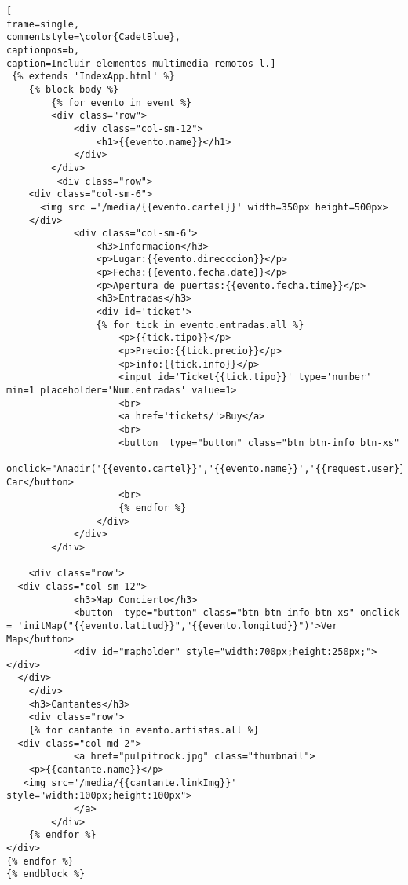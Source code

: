 \begin{lstlisting}[
frame=single,
commentstyle=\color{CadetBlue},
captionpos=b,
caption=Incluir elementos multimedia remotos l.]
 {% extends 'IndexApp.html' %}
	{% block body %}
		{% for evento in event %}
		<div class="row">
			<div class="col-sm-12">
				<h1>{{evento.name}}</h1>
			</div>
		</div>
		 <div class="row">
    <div class="col-sm-6">
      <img src ='/media/{{evento.cartel}}' width=350px height=500px>
    </div>
			<div class="col-sm-6">
				<h3>Informacion</h3>
				<p>Lugar:{{evento.direcccion}}</p>
				<p>Fecha:{{evento.fecha.date}}</p>
				<p>Apertura de puertas:{{evento.fecha.time}}</p>
				<h3>Entradas</h3>
				<div id='ticket'>
				{% for tick in evento.entradas.all %}
					<p>{{tick.tipo}}</p>
					<p>Precio:{{tick.precio}}</p>
					<p>info:{{tick.info}}</p>
					<input id='Ticket{{tick.tipo}}' type='number' min=1 placeholder='Num.entradas' value=1>
					<br>
					<a href='tickets/'>Buy</a>
					<br>
					<button  type="button" class="btn btn-info btn-xs"  
					onclick="Anadir('{{evento.cartel}}','{{evento.name}}','{{request.user}}','{{tick.tipo}}','{{tick.precio}}','Ticket{{tick.tipo}}')">Add Car</button>
					<br>
					{% endfor %}
				</div>
			</div>
		</div>
		
	<div class="row">
  <div class="col-sm-12">
			<h3>Map Concierto</h3>
			<button  type="button" class="btn btn-info btn-xs" onclick = 'initMap("{{evento.latitud}}","{{evento.longitud}}")'>Ver Map</button>
			<div id="mapholder" style="width:700px;height:250px;"></div>
  </div>
	</div>
	<h3>Cantantes</h3>
	<div class="row">
	{% for cantante in evento.artistas.all %}
  <div class="col-md-2">
			<a href="pulpitrock.jpg" class="thumbnail">
  	<p>{{cantante.name}}</p>
   <img src='/media/{{cantante.linkImg}}' style="width:100px;height:100px">
			</a>
		</div>
	{% endfor %}
</div>
{% endfor %}
{% endblock %}
\end{lstlisting}

